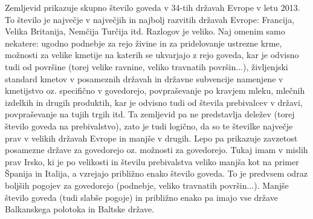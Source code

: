 \documentclass[11pt,a4paper]{article}
\begin{document}
\noindent Zemljevid prikazuje skupno število goveda v 34-tih državah Evrope v letu 2013. To število je največje v največjih in najbolj razvitih državah Evrope: Francija, Velika Britanija, Nemčija Turčija itd. Razlogov je veliko. Naj omenim samo nekatere: ugodno podnebje za rejo živine in za pridelovanje ustrezne krme, možnosti za velike kmetije na katerih se ukvarjajo z rejo goveda, kar je odvisno tudi od površine (torej velike ravnine, veliko travnatih površin...), življenjski standard kmetov v posameznih državah in državne subvencije namenjene v kmetijstvo oz. specifično v govedorejo, povpraševanje po kravjem mleku, mlečnih izdelkih in drugih produktih, kar je odvisno tudi od števila prebivalcev v državi, povpraševanje na tujih trgih itd. Ta zemljevid pa ne predstavlja deležev (torej število goveda na prebivalstvo), zato je tudi logično, da so te številke največje prav v velikih državah Evrope in manjše v drugih. Lepo pa prikazuje zavzetost posamezne države za govedorejo oz. možnosti za govedorejo. Tukaj imam v mislih prav Irsko, ki je po velikosti in številu prebivalstva veliko manjša kot na primer Španija in Italija, a vzrejajo približno enako število goveda. To je predvsem odraz boljših pogojev za govedorejo (podnebje, veliko travnatih površin...). Manjše število goveda (tudi slabše pogoje) in približno enako pa imajo vse države Balkanskega polotoka in Baltske države.
\newline
\end{document}
